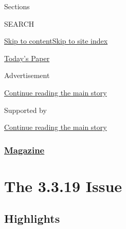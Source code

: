 Sections

SEARCH

\protect\hyperlink{site-content}{Skip to
content}\protect\hyperlink{site-index}{Skip to site index}

\href{https://myaccount.nytimes3xbfgragh.onion/auth/login?response_type=cookie\&client_id=vi}{}

\href{https://www.nytimes3xbfgragh.onion/section/todayspaper}{Today's
Paper}

Advertisement

\protect\hyperlink{after-top}{Continue reading the main story}

Supported by

\protect\hyperlink{after-sponsor}{Continue reading the main story}

\hypertarget{magazine}{%
\subsubsection{\texorpdfstring{\href{/section/magazine}{Magazine}}{Magazine}}\label{magazine}}

\hypertarget{the-3319-issue}{%
\section{The 3.3.19 Issue}\label{the-3319-issue}}

\hypertarget{highlights}{%
\subsection{Highlights}\label{highlights}}

